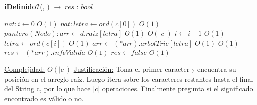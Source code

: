 \begin{algorithm}[H]{\textbf{iDefinido?}(, ) $\to$ $res$ : $bool$}
	\begin{algorithmic}
		\State $nat: i \gets 0$ \Comment $O(1)$
		\State $nat: letra \gets ord(c[0])$ \Comment $O(1)$
		\State $puntero(Nodo): arr \gets d.raiz[letra]$ \Comment $O(1)$
		 \Comment $O(|c|)$
			\State $i \gets i + 1$ \Comment $O(1)$
			\State $letra \gets ord(c[i])$ \Comment $O(1)$
			\State $arr \gets (*arr).arbolTrie[letra]$ \Comment $O(1)$
		\EndWhile
		 \Comment $O(1)$		
			\State $res \gets (*arr).infoValida$ \Comment $O(1)$
		\Else
			\State $res \gets false$ \Comment $O(1)$
		\EndIf

		\medskip
		\Statex \underline{Complejidad:} $O(|c|)$
		\Statex \underline{Justificación:} Toma el primer caracter y encuentra su posición en el arreglo raíz. Luego itera sobre los caracteres restantes hasta el final del String c, por lo que hace |$c$| operaciones. Finalmente pregunta si el significado encontrado es válido o no.
    \end{algorithmic}
\end{algorithm}


